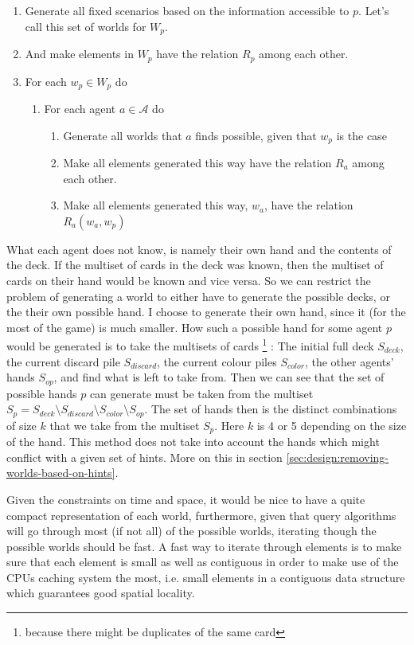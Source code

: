 \begin{enumerate}
	\item Generate all fixed scenarios based on the information accessible to $p$. Let's call this set of worlds for $W_p$. 
	\item And make elements in $W_p$ have the relation $R_p$ among each other.
	\item For each $w_p \in W_p$ do
		\begin{enumerate}
			\item For each agent $a \in \mathcal{A}$ do
				\begin{enumerate}
				\item Generate all worlds that $a$ finds possible, given that $w_p$ is the case
				\item Make all elements generated this way have the relation $R_a$ among each other.
				\item Make all elements generated this way, $w_a$, have the relation $R_a(w_a,w_p)$
				\end{enumerate}
		\end{enumerate}
\end{enumerate}

What each agent does not know, is namely their own hand and the contents of the deck. 
If the multiset of cards in the deck was known, then the multiset of cards on their hand would be known and vice versa. 
So we can restrict the problem of generating a world to either have to generate the possible decks, or the their own possible hand. 
I choose to generate their own hand, since it (for the most of the game) is much smaller.
How such a possible hand for some agent $p$ would be generated is to take the multisets of cards
\footnote{because there might be duplicates of the same card}
: The initial full deck $S_{deck}$, the current discard pile $S_{discard}$, the current colour piles $S_{color}$, the other agents' hands $S_{op}$, and find what is left to take from. 
 Then we can see that the set of possible hands $p$ can generate must be taken from the multiset $S_p = S_{deck} \setminus S_{discard} \setminus S_{color} \setminus S_{op}$. 
The set of hands then is the distinct combinations of size $k$ that we take from the multiset $S_p$.
Here $k$ is 4 or 5 depending on the size of the hand.
This method does not take into account the hands which might conflict with a given set of hints. 
More on this in section \ref{sec:design:removing-worlds-based-on-hints}.


Given the constraints on time and space, it would be nice to have a quite compact representation of each world, furthermore, given that query algorithms will go through most (if not all) of the possible worlds, iterating though the possible worlds should be fast. 
A fast way to iterate through elements is to make sure that each element is small as well as contiguous in order to make use of the CPUs caching system the most, i.e. small elements in a contiguous data structure which guarantees good spatial locality.



